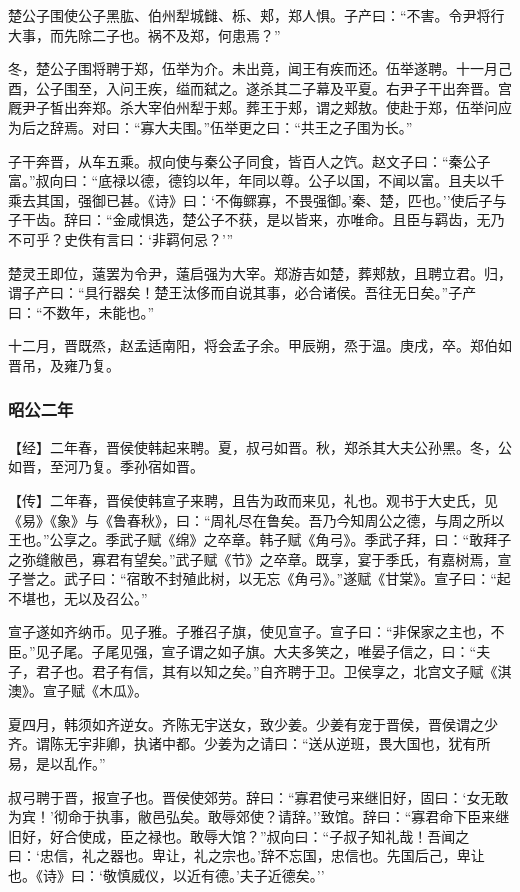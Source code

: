 \documentclass[]{article}
\begin{document}
楚公子围使公子黑肱、伯州犁城雠、栎、郏，郑人惧。子产曰：``不害。令尹将行大事，而先除二子也。祸不及郑，何患焉？''

冬，楚公子围将聘于郑，伍举为介。未出竟，闻王有疾而还。伍举遂聘。十一月己酉，公子围至，入问王疾，缢而弑之。遂杀其二子幕及平夏。右尹子干出奔晋。宫厩尹子皙出奔郑。杀大宰伯州犁于郏。葬王于郏，谓之郏敖。使赴于郑，伍举问应为后之辞焉。对曰：``寡大夫围。''伍举更之曰：``共王之子围为长。''

子干奔晋，从车五乘。叔向使与秦公子同食，皆百人之饩。赵文子曰：``秦公子富。''叔向曰：``底禄以德，德钧以年，年同以尊。公子以国，不闻以富。且夫以千乘去其国，强御已甚。《诗》曰：`不侮鳏寡，不畏强御。'秦、楚，匹也。''使后子与子干齿。辞曰：``金咸惧选，楚公子不获，是以皆来，亦唯命。且臣与羁齿，无乃不可乎？史佚有言曰：`非羁何忌？'''

楚灵王即位，薳罢为令尹，薳启强为大宰。郑游吉如楚，葬郏敖，且聘立君。归，谓子产曰：``具行器矣！楚王汰侈而自说其事，必合诸侯。吾往无日矣。''子产曰：``不数年，未能也。''

十二月，晋既烝，赵孟适南阳，将会孟子余。甲辰朔，烝于温。庚戌，卒。郑伯如晋吊，及雍乃复。

\hypertarget{header-n2386}{%
\subsubsection{昭公二年}\label{header-n2386}}

【经】二年春，晋侯使韩起来聘。夏，叔弓如晋。秋，郑杀其大夫公孙黑。冬，公如晋，至河乃复。季孙宿如晋。

【传】二年春，晋侯使韩宣子来聘，且告为政而来见，礼也。观书于大史氏，见《易》《象》与《鲁春秋》，曰：``周礼尽在鲁矣。吾乃今知周公之德，与周之所以王也。''公享之。季武子赋《绵》之卒章。韩子赋《角弓》。季武子拜，曰：``敢拜子之弥缝敝邑，寡君有望矣。''武子赋《节》之卒章。既享，宴于季氏，有嘉树焉，宣子誉之。武子曰：``宿敢不封殖此树，以无忘《角弓》。''遂赋《甘棠》。宣子曰：``起不堪也，无以及召公。''

宣子遂如齐纳币。见子雅。子雅召子旗，使见宣子。宣子曰：``非保家之主也，不臣。''见子尾。子尾见强，宣子谓之如子旗。大夫多笑之，唯晏子信之，曰：``夫子，君子也。君子有信，其有以知之矣。''自齐聘于卫。卫侯享之，北宫文子赋《淇澳》。宣子赋《木瓜》。

夏四月，韩须如齐逆女。齐陈无宇送女，致少姜。少姜有宠于晋侯，晋侯谓之少齐。谓陈无宇非卿，执诸中都。少姜为之请曰：``送从逆班，畏大国也，犹有所易，是以乱作。''

叔弓聘于晋，报宣子也。晋侯使郊劳。辞曰：``寡君使弓来继旧好，固曰：`女无敢为宾！'彻命于执事，敝邑弘矣。敢辱郊使？请辞。''致馆。辞曰：``寡君命下臣来继旧好，好合使成，臣之禄也。敢辱大馆？''叔向曰：``子叔子知礼哉！吾闻之曰：`忠信，礼之器也。卑让，礼之宗也。'辞不忘国，忠信也。先国后己，卑让也。《诗》曰：`敬慎威仪，以近有德。'夫子近德矣。''
\end{document}
